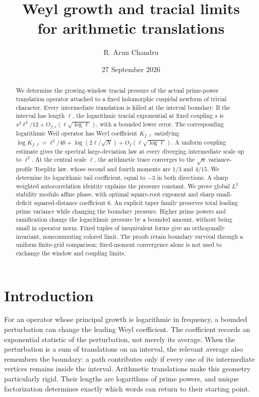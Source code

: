 \documentclass[11pt,reqno]{amsart}
\title[Weyl growth and arithmetic tracial limits]{Weyl growth and tracial limits\texorpdfstring{\\}{ }for arithmetic translations}
\author{R. Arun Chandru}
\date{27 September 2026}
\numberwithin{equation}{section}
\begin{document}
\begin{abstract}
We determine the growing-window tracial pressure of the actual
prime-power translation operator attached to a fixed holomorphic
cuspidal newform of trivial character. Every intermediate translation
is killed at the interval boundary. If the interval has length $\ell$,
the logarithmic tracial exponential at fixed coupling $s$ is
$s^2\ell^2/12+O_{f,s}(\ell\sqrt{\log\ell})$, with a bounded lower
error. The corresponding logarithmic Weil operator has Weyl
coefficient $K_{f,\ell}$ satisfying
$\log K_{f,\ell}=\ell^2/48+\log(2\ell/\sqrt N)
+O_f(\ell\sqrt{\log\ell})$.
A uniform coupling estimate gives the spectral large-deviation law
at every diverging intermediate scale up to $\ell^2$.
At the central scale $\ell$, the arithmetic trace converges to the
$\sqrt a$ variance-profile Toeplitz law, whose second and fourth
moments are $1/3$ and $4/15$. We determine its logarithmic tail
coefficient, equal to $-3$ in both directions. A sharp weighted
autocorrelation identity explains the pressure constant. We prove
global $L^2$ stability modulo affine phase, with optimal square-root
exponent and sharp small-deficit squared-distance coefficient $6$.
An explicit taper family preserves total leading prime variance
while changing the boundary pressure. Higher prime powers and ramification change
the logarithmic pressure by a bounded amount, without being small
in operator norm. Fixed tuples of inequivalent forms give an
orthogonally invariant, noncommuting colored limit. The proofs
retain boundary survival through a uniform finite-grid comparison;
fixed-moment convergence alone is not used to exchange the window
and coupling limits.
\end{abstract}

\maketitle
\tableofcontents

\section{Introduction}\label{sec:introduction}

For an operator whose principal growth is logarithmic in frequency,
a bounded perturbation can change the leading Weyl coefficient.
The coefficient records an exponential statistic of the perturbation,
not merely its average. When the perturbation is a sum of translations
on an interval, the relevant average also remembers the boundary:
a path contributes only if every one of its intermediate vertices
remains inside the interval. Arithmetic translations make this
geometry particularly rigid. Their lengths are logarithms of prime
powers, and unique factorization determines exactly which words can
return to their starting point.
\end{document}
